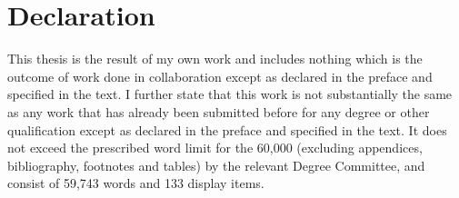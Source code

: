 \chapter{Declaration}
This thesis is the result of my own work and includes nothing which is the outcome of work done in collaboration except as declared in the preface and specified in the text. I further state that this work is not substantially the same as any work that has already been submitted before for any degree or other qualification except as declared in the preface and specified in the text. It does not exceed the prescribed word limit for the 60,000 (excluding appendices, bibliography, footnotes and tables) by the relevant Degree Committee, and consist of 59,743 words and 133 display items.



